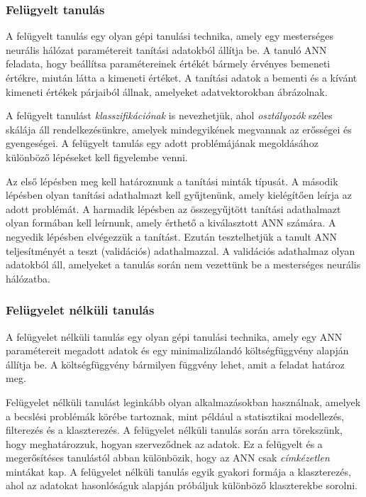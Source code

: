 \documentclass[12pt,a4]{article}
\begin{document}
	\subsubsection{Felügyelt tanulás}
	
	A felügyelt tanulás egy olyan gépi tanulási technika, amely egy mesterséges neurális hálózat paramétereit tanítási
	adatokból állítja be. A tanuló ANN feladata, hogy beállítsa paramétereinek értékét bármely érvényes bemeneti értékre, miután látta a kimeneti értéket.
	A tanítási adatok a bementi és a kívánt kimeneti értékek párjaiból állnak, amelyeket adatvektorokban ábrázolnak.
	
	
	A felügyelt tanulást \textit{klasszifikációnak} is nevezhetjük, ahol \textit{osztályozók} széles skálája áll rendelkezésünkre, amelyek mindegyikének megvannak az erősségei és gyengeségei.
	A felügyelt tanulás egy
	adott problémájának megoldásához különböző lépéseket kell figyelembe venni.
	
	 Az első lépésben meg kell határoznunk a tanítási minták típusát. A második
	lépésben olyan tanítási adathalmazt kell gyűjtenünk, amely kielégítően leírja az adott problémát.
	A harmadik lépésben az összegyűjtött tanítási adathalmazt
	olyan formában kell leírnunk, amely érthető a kiválasztott ANN számára. A negyedik lépésben elvégezzük
	a tanítást. Ezután tesztelhetjük a tanult ANN teljesítményét a teszt (validációs) adathalmazzal.
	A validációs adathalmaz olyan adatokból áll, amelyeket a tanulás során nem vezettünk be a mesterséges neurális hálózatba.
	
	\subsubsection{Felügyelet nélküli tanulás}
	
	A felügyelet nélküli tanulás egy olyan gépi tanulási technika, amely egy ANN paramétereit megadott adatok és egy minimalizálandó 
	költségfüggvény alapján állítja be. A költségfüggvény bármilyen függvény lehet, amit a feladat határoz meg.
	
	
	Felügyelet nélküli tanulást leginkább olyan alkalmazásokban használnak, amelyek a becslési problémák körébe tartoznak, mint például a statisztikai modellezés, filterezés és a klaszterezés. A felügyelet 
	nélküli tanulás során arra törekszünk, hogy meghatározzuk, hogyan szerveződnek az adatok. Ez a felügyelt és a megerősítéses tanulástól abban különbözik, hogy az ANN csak \textit{címkézetlen} mintákat kap. A felügyelet nélküli tanulás egyik gyakori formája a klaszterezés, ahol az adatokat hasonlóságuk alapján próbáljuk különböző klaszterekbe sorolni.
	
\end{document}
